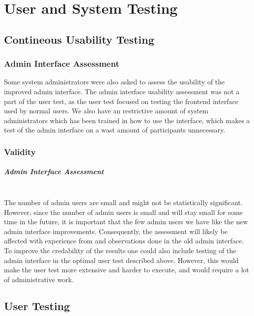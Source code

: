 \chapter{User and System Testing}

\section{Contineous Usability Testing}

\subsection{Admin Interface Assessment}
Some system administrators were also asked to assess the usability of the improved admin interface. The admin interface usability assessment was not a part of the user test, as the user test focused on testing the frontend interface used by normal users. We also have an restrictive amount of system administrators which has been trained in how to use the interface, which makes a test of the admin interface on a wast amount of participants unnecessary.


\subsection{Validity}
\paragraph*{Admin Interface Assessment} \hfill \\
The number of admin users are small and might not be statistically significant. However, since the number of admin users is small and will stay small for some time in the future, it is important that the few admin users we have like the new admin interface improvements. Consequently, the assessment will likely be affected with experience from and observations done in the old admin interface. To improve the credability of the results one could also include testing of the admin interface in the optimal user test described above. However, this would make the user test more extensive and harder to execute, and would require a lot of administrative work.

\section{User Testing}
\label{sec:user-testing}

